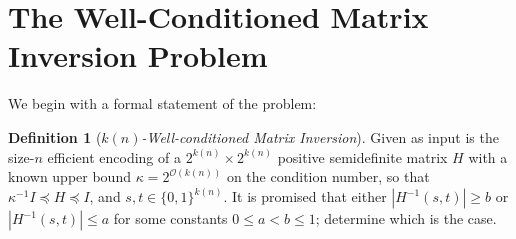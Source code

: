 \documentclass[11pt]{article}
\newtheorem{theorem}{Theorem}
\theoremstyle{definition}
\newtheorem{definition}[theorem]{Definition}
\theoremstyle{remark}
\newcommand\matrixinvert[1]{{\ensuremath{#1}}\textit{-Well-conditioned Matrix Inversion}}
\newcommand{\classfont}{\sf}
\newcommand{\Unitary}{\mathbf{U}}
\newcommand{\unitaryBQSPACE}[1]{{\classfont{BQ}_\Unitary\classfont{SPACE}}[#1]}
\DeclareMathOperator{\poly}{poly}
\begin{document}
\section{The Well-Conditioned Matrix Inversion Problem} \label{sec: Matrix Inversion}


We begin with a formal statement of the problem:
\begin{definition}[\matrixinvert{k(n)}] \label{def: matrix invert}
Given as input is the size-$n$ efficient encoding of a $2^{k(n)} \times 2^{k(n)}$ positive semidefinite matrix $H$ with a known upper bound $\kappa = 2^{\mathcal{O}(k(n))}$ on the condition number, so that $\kappa^{-1}I\preceq H \preceq I$, and $s,t\in \lbrace 0,1\rbrace^{k(n)}$. It is promised that either $|H^{-1}(s,t)|\geq b$
 or $|H^{-1}(s,t)|\leq a$ for some constants $0 \le a < b \le 1$; determine which is the case.
 \end{definition}
\end{document}
